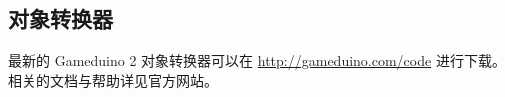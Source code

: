 \documentclass[10pt]{book}
\newcommand{\gdtwo}{Gameduino 2 }
\begin{document}
\begin{CJK}{UTF8}{gkai}

\appendix

\chapter{对象转换器}

最新的 \gdtwo 对象转换器可以在 \url{http://gameduino.com/code} 进行下载。相关的文档与帮助详见官方网站。

\clearpage
{}
\printindex

\end{CJK}
\end{document}
